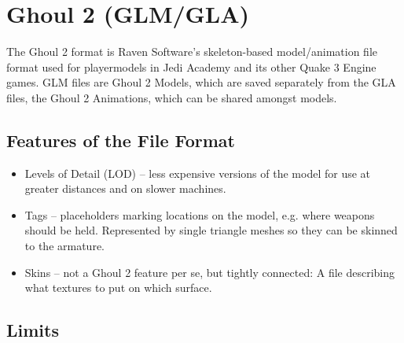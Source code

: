 \documentclass[a4paper,10pt]{article}
\begin{document}
 
 \section{Ghoul 2 (GLM/GLA)}
 
 The Ghoul 2 format is Raven Software's skeleton-based model/animation file format used for playermodels in
 Jedi Academy and its other Quake 3 Engine games. GLM files are Ghoul 2 Models, which are saved separately from
 the GLA files, the Ghoul 2 Animations, which can be shared amongst models.
 
 
 \subsection{Features of the File Format}
 \begin{itemize}
  \item Levels of Detail (LOD) -- less expensive versions of the model for use at greater distances and on
  slower machines.
  \item Tags -- placeholders marking locations on the model, e.g. where weapons should be held. Represented by
  single triangle meshes so they can be skinned to the armature.
  \item Skins -- not a Ghoul 2 feature per se, but tightly connected: A file describing what textures to put on
  which surface.
 \end{itemize}
 
 
 \subsection{Limits}
 
\end{document}
